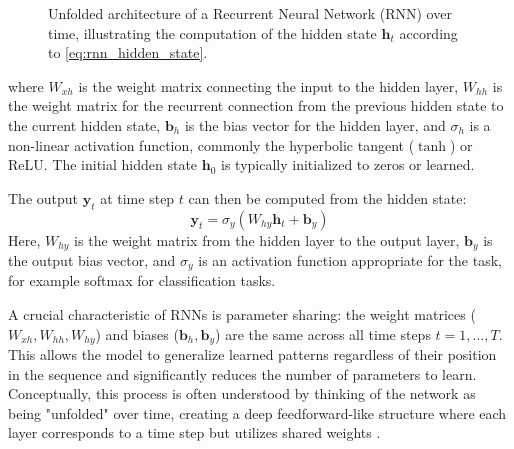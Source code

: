 \begin{figure}[htbp]
  \caption{Unfolded architecture of a Recurrent Neural Network (RNN) over time, illustrating the computation of the hidden state \(\bm{h}_t\) according to \autoref{eq:rnn_hidden_state}.}
  \label{fig:rnn_unfolded}
\end{figure}
where \( W_{xh} \) is the weight matrix connecting the input to the hidden layer, \( W_{hh} \) is the weight matrix for the recurrent connection from the previous hidden state to the current hidden state, \( \bm{b}_h \) is the bias vector for the hidden layer, and \( \sigma_h \) is a non-linear activation function, commonly the hyperbolic tangent (\(\tanh\)) or ReLU. The initial hidden state \( \bm{h}_0 \) is typically initialized to zeros or learned.

The output \( \bm{y}_t \) at time step \( t \) can then be computed from the hidden state:
\begin{equation}
  \bm{y}_t = \sigma_y (W_{hy} \bm{h}_t + \bm{b}_y)
  \label{eq:rnn_output}
\end{equation}
Here, \( W_{hy} \) is the weight matrix from the hidden layer to the output layer, \( \bm{b}_y \) is the output bias vector, and \( \sigma_y \) is an activation function appropriate for the task, for example softmax for classification tasks.

A crucial characteristic of RNNs is parameter sharing: the weight matrices (\( W_{xh}, W_{hh}, W_{hy} \)) and biases (\( \bm{b}_h, \bm{b}_y \)) are the same across all time steps \( t = 1, ..., T \). This allows the model to generalize learned patterns regardless of their position in the sequence and significantly reduces the number of parameters to learn. Conceptually, this process is often understood by thinking of the network as being "unfolded" over time, creating a deep feedforward-like structure where each layer corresponds to a time step but utilizes shared weights \autocite{medsker2001recurrent}.

